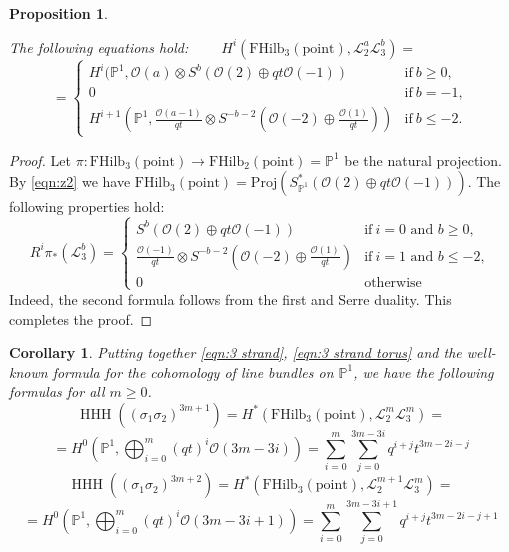 \documentclass[12pt]{amsart}
\numberwithin{equation}{section}
\newtheorem{proposition}[theorem]{Proposition}
\newtheorem{corollary}[theorem]{Corollary}
\theoremstyle{definition}
\theoremstyle{remark}
\DeclareMathOperator{\HHH}{HHH}
\newcommand{\PP}{\mathbb{P}}
\newcommand{\CL}{\mathcal{L}}
\newcommand{\CO}{\mathcal{O}}
\renewcommand{\1}{\mathbf{1}}
\newcommand{\FH}{\mathrm{FHilb}}
\newcommand{\point}{\mathrm{point}}
\newcommand{\proj}{\mathrm{Proj}}
\begin{document}
\begin{proposition}
\label{prop:3 strand torus}

The following equations hold: $\qquad H^{i}(\FH_3(\point),\CL_2^{a}\CL_3^{b}) =$
\begin{equation}
\label{eqn:3 strand torus}
= \begin{cases}
H^i(\PP^1,\CO(a)\otimes S^b(\CO(2)\oplus qt\CO(-1))& \text{if}\ b\ge 0,\\
0& \text{if}\ b=-1, \\
H^{i+1} \left(\PP^1,\frac {\CO(a-1)}{qt} \otimes S^{-b-2}\left(\CO(-2) \oplus \frac {\CO(1)}{qt} \right) \right)& \text{if}\ b\le -2.
\end{cases}
\end{equation}
\end{proposition}

\begin{proof} Let $\pi:\FH_3(\point)\to \FH_2(\point)=\PP^1$ be the natural projection.
By \eqref{eqn:z2} we have $\FH_3(\point) = \proj \left( S^*_{\PP^1} (\CO(2)\oplus qt\CO(-1)) \right)$. The following properties hold:
$$
R^{i}\pi_* \left( \CL_3^{b} \right)=\begin{cases}
S^b(\CO(2)\oplus qt\CO(-1)) & \text{if} \ i=0 \text{ and } b\ge 0, \\
\frac {\CO(-1)}{qt} \otimes S^{-b-2}\left(\CO(-2) \oplus \frac {\CO(1)}{qt} \right) &\text{if} \ i=1 \text{ and } b\le -2, \\
0 & \text{otherwise}
\end{cases}
$$
Indeed, the second formula follows from the first and Serre duality. This completes the proof.
\end{proof}

\begin{corollary}
\label{cor:3 strand torus}
Putting together \eqref{eqn:3 strand}, \eqref{eqn:3 strand torus} and the well-known formula for the cohomology of line bundles on $\PP^1$, we have the following formulas for all $m \geq 0$. 
\begin{equation}
\label{eqn:hhh 3 strand 1}
\HHH \left( (\sigma_1\sigma_2)^{3m+1} \right) = H^*(\FH_3(\point),\CL_2^{m}\CL_3^{m}) = 
\end{equation}
$$
= H^0 \left(\PP^1,  \bigoplus_{i=0}^m (qt)^i \CO(3m-3i)\right) = \sum_{i=0}^m \sum_{j=0}^{3m-3i} q^{i+j} t^{3m-2i-j}
$$
\begin{equation}
\label{eqn:hhh 3 strand 2}
\HHH \left( ( \sigma_1\sigma_2)^{3m+2} \right) = H^*(\FH_3(\point),\CL_2^{m+1}\CL_3^{m})=
\end{equation}
$$
= H^0 \left(\PP^1,  \bigoplus_{i=0}^m (qt)^i \CO(3m-3i+1)\right) = \sum_{i=0}^m \sum_{j=0}^{3m-3i+1} q^{i+j} t^{3m-2i-j+1}
$$
\end{corollary}
\end{document}

